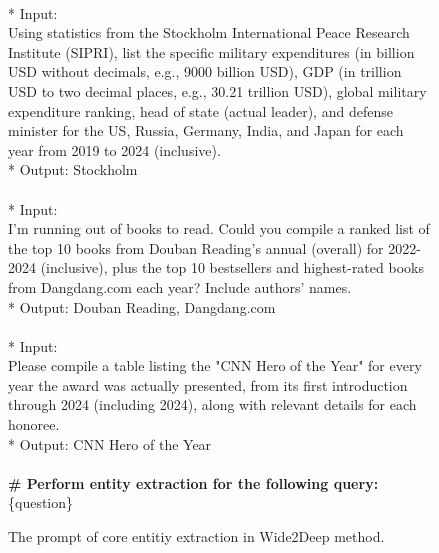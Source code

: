 \documentclass[11pt, letterpaper, logo, onecolumn, copyright, numbering]{paper_improved}
\begin{document}
\begin{figure}[htbp]
\begin{tcolorbox}
\\
* Input:\\
Using statistics from the Stockholm International Peace Research Institute (SIPRI), list the specific military expenditures (in billion USD without decimals, e.g., 9000 billion USD), GDP (in trillion USD to two decimal places, e.g., 30.21 trillion USD), global military expenditure ranking, head of state (actual leader), and defense minister for the US, Russia, Germany, India, and Japan for each year from 2019 to 2024 (inclusive).\\
* Output: Stockholm\\
\\
* Input:\\
I'm running out of books to read. Could you compile a ranked list of the top 10 books from Douban Reading's annual (overall) for 2022-2024 (inclusive), plus the top 10 bestsellers and highest-rated books from Dangdang.com each year? Include authors' names.\\
* Output: Douban Reading, Dangdang.com\\
\\
* Input:\\
Please compile a table listing the "CNN Hero of the Year" for every year the award was actually presented, from its first introduction through 2024 (including 2024), along with relevant details for each honoree.\\
* Output: CNN Hero of the Year\\
\\
\textbf{\# Perform entity extraction for the following query:}\\
\{question\}
\end{tcolorbox}
\caption{The prompt of core entitiy extraction in Wide2Deep method.}
\label{img:entity_extraction_prompt}
\end{figure}
\end{document}
